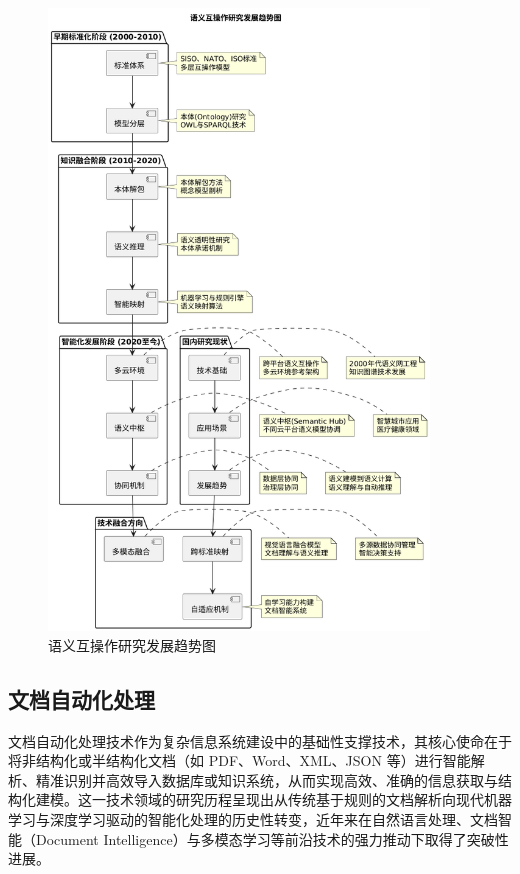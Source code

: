 \begin{figure}[H]
    \centering
    \includegraphics[width=0.9\textwidth,height=0.6\textheight,keepaspectratio]{chapters/fig-0/semantic_interop_research_trends.png}
    \caption{语义互操作研究发展趋势图}
    \label{fig_semantic_interop_research_trends}
\end{figure}


\subsection{文档自动化处理}

文档自动化处理技术作为复杂信息系统建设中的基础性支撑技术，其核心使命在于将非结构化或半结构化文档（如 PDF、Word、XML、JSON 等）进行智能解析、精准识别并高效导入数据库或知识系统，从而实现高效、准确的信息获取与结构化建模。这一技术领域的研究历程呈现出从传统基于规则的文档解析向现代机器学习与深度学习驱动的智能化处理的历史性转变，近年来在自然语言处理、文档智能（Document Intelligence）与多模态学习等前沿技术的强力推动下取得了突破性进展。

